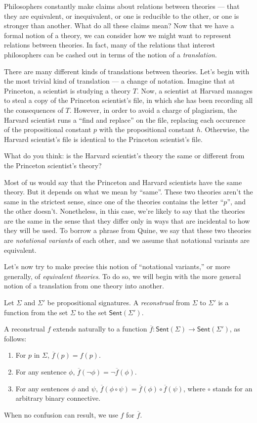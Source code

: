 Philosophers constantly make claims about relations between theories
--- that they are equivalent, or inequivalent, or one is reducible to
the other, or one is stronger than another.  What do all these claims
mean?  Now that we have a formal notion of a theory, we can consider
how we might want to represent relations between theories.  In fact,
many of the relations that interest philosophers can be cashed out in
terms of the notion of a {\it translation}.

There are many different kinds of translations between theories.
Let's begin with the most trivial kind of translation --- a change of
notation.  Imagine that at Princeton, a scientist is studying a theory
$T$.  Now, a scientist at Harvard manages to steal a copy of the
Princeton scientist's file, in which she has been recording all the
consequences of $T$.  However, in order to avoid a charge of
plagiarism, the Harvard scientist runs a ``find and replace'' on the
file, replacing each occurence of the propositional constant $p$ with
the propositional constant $h$.  Otherwise, the Harvard scientist's
file is identical to the Princeton scientist's file.

What do you think: is the Harvard scientist's theory the same or
different from the Princeton scientist's theory?

Most of us would say that the Princeton and Harvard scientists have
the same theory.  But it depends on what we mean by ``same''.  These
two theories aren't the same in the strictest sense, since one of the
theories contains the letter ``$p$'', and the other doesn't.
Nonetheless, in this case, we're likely to say that the theories are
the same in the sense that they differ only in ways that are
incidental to how they will be used.  To borrow a phrase from Quine,
we say that these two theories are \emph{notational variants} of each
other, and we assume that notational variants are equivalent.

Let's now try to make precise this notion of ``notational variants,''
or more generally, of \emph{equivalent theories}.  To do so, we will
begin with the more general notion of a translation from one theory
into another.

\begin{defn} Let $\Sigma$ and $\Sigma '$ be propositional signatures.
  A \emph{reconstrual} from $\Sigma$ to $\Sigma '$ is a function from
  the set $\Sigma$ to the set $\mathsf{Sent}(\Sigma
  ')$.  \end{defn} \noindent A reconstrual $f$ extends naturally to a
function
$\overline{f}:\mathsf{Sent}(\Sigma )\to \mathsf{Sent}(\Sigma ')$, as
follows:
\begin{enumerate}
\item For $p$ in $\Sigma$, $\overline{f}(p)=f(p)$. 
\item For any sentence $\phi$, $\overline{f}(\neg \phi )=\neg
  \overline{f}(\phi )$.
\item For any sentences $\phi$ and $\psi$, $\overline{f}(\phi\circ\psi
  )=\overline{f}(\phi )\circ \overline{f}(\psi )$, where $\circ$
  stands for an arbitrary binary connective.  \end{enumerate} When no
confusion can result, we use $f$ for $\overline{f}$.

